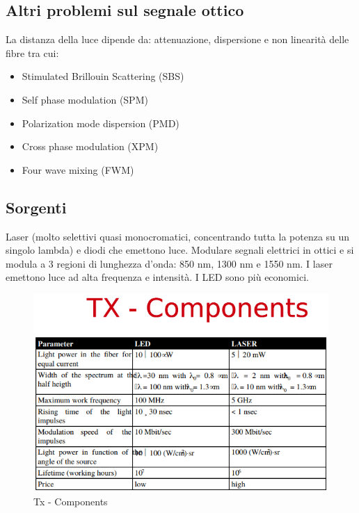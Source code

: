 \documentclass[8pt]{extarticle}
\begin{document}
\subsection{Altri problemi sul segnale ottico}
La distanza della luce dipende da: attenuazione, dispersione e non linearità delle fibre tra cui:
\begin{itemize}
	\item  Stimulated Brillouin Scattering (SBS)
	\item Self phase modulation (SPM)
	\item Polarization mode dispersion (PMD)
	\item Cross phase modulation (XPM)
	\item Four wave mixing (FWM)
\end{itemize}
\subsection{Sorgenti}
Laser (molto selettivi quasi monocromatici, concentrando tutta la potenza su un singolo lambda) e diodi che emettono luce. Modulare segnali elettrici in ottici e si modula a 3 regioni di lunghezza d’onda: 850 nm, 1300 nm e 1550 nm. I laser emettono luce ad alta frequenza e intensità. I LED sono più economici.
\begin{figure}[H]
	\center
	\includegraphics[scale=0.35]{images/FO10.png}
    \caption{Tx - Components}\label{fig:1}
\end{figure}
\end{document}
